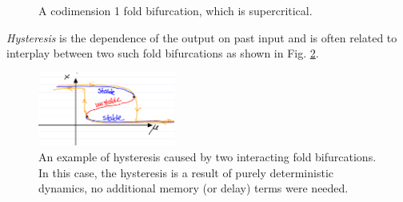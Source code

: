 \begin{enumerate}
\begin{figure}[h!]
			\caption{A codimension 1 fold bifurcation, which is supercritical.}
			\label{fig:codim1_bif}
		\end{figure}
		\begin{remark}[]
			\emph{Hysteresis} is the dependence of the output on past input and is often related to interplay between two such fold bifurcations as shown in Fig. \ref{fig:hysteresis}.
		\begin{figure}[h!]
			\centering
			\includegraphics[width=0.4\textwidth]{figures/ch3/14hysteresis.png}
			\caption{An example of hysteresis caused by two interacting fold bifurcations. In this case, the hysteresis is a result of purely deterministic dynamics, no additional memory (or delay) terms were needed.}
			\label{fig:hysteresis}
		\end{figure}
		
		\end{remark}
		

\end{enumerate}
